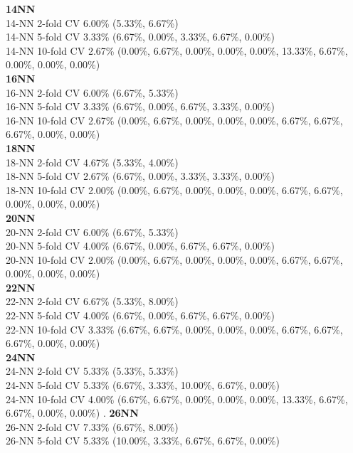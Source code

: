 \documentclass[11pt,a4paper]{article}
\begin{document}
\textbf{14NN }\\
14-NN 2-fold CV  6.00\%  (5.33\%, 6.67\%)\\  
14-NN 5-fold CV  3.33\%  (6.67\%, 0.00\%, 3.33\%, 6.67\%, 0.00\%)\\  
14-NN 10-fold CV  2.67\%  (0.00\%, 6.67\%, 0.00\%, 0.00\%, 0.00\%, 13.33\%, 6.67\%, 0.00\%, 0.00\%, 0.00\%)\\  
\textbf{16NN }\\
16-NN 2-fold CV  6.00\%  (6.67\%, 5.33\%)\\  
16-NN 5-fold CV  3.33\%  (6.67\%, 0.00\%, 6.67\%, 3.33\%, 0.00\%)\\  
16-NN 10-fold CV  2.67\%  (0.00\%, 6.67\%, 0.00\%, 0.00\%, 0.00\%, 6.67\%, 6.67\%, 6.67\%, 0.00\%, 0.00\%)\\  
\textbf{18NN }\\
18-NN 2-fold CV  4.67\%  (5.33\%, 4.00\%)\\  
18-NN 5-fold CV  2.67\%  (6.67\%, 0.00\%, 3.33\%, 3.33\%, 0.00\%)\\  
18-NN 10-fold CV  2.00\%  (0.00\%, 6.67\%, 0.00\%, 0.00\%, 0.00\%, 6.67\%, 6.67\%, 0.00\%, 0.00\%, 0.00\%)\\  
\textbf{20NN }\\
20-NN 2-fold CV  6.00\%  (6.67\%, 5.33\%)\\  
20-NN 5-fold CV  4.00\%  (6.67\%, 0.00\%, 6.67\%, 6.67\%, 0.00\%)\\  
20-NN 10-fold CV  2.00\%  (0.00\%, 6.67\%, 0.00\%, 0.00\%, 0.00\%, 6.67\%, 6.67\%, 0.00\%, 0.00\%, 0.00\%)\\  
\textbf{22NN }\\
22-NN 2-fold CV  6.67\%  (5.33\%, 8.00\%)\\  
22-NN 5-fold CV  4.00\%  (6.67\%, 0.00\%, 6.67\%, 6.67\%, 0.00\%)\\  
22-NN 10-fold CV  3.33\%  (6.67\%, 6.67\%, 0.00\%, 0.00\%, 0.00\%, 6.67\%, 6.67\%, 6.67\%, 0.00\%, 0.00\%) \\
\textbf{24NN }\\
24-NN 2-fold CV  5.33\%  (5.33\%, 5.33\%)\\  
24-NN 5-fold CV  5.33\%  (6.67\%, 3.33\%, 10.00\%, 6.67\%, 0.00\%)\\  
24-NN 10-fold CV  4.00\%  (6.67\%, 6.67\%, 0.00\%, 0.00\%, 0.00\%, 13.33\%, 6.67\%, 6.67\%, 0.00\%, 0.00\%) 
\newpage .\hspace*{-0.85cm}
\textbf{26NN }\\
26-NN 2-fold CV  7.33\%  (6.67\%, 8.00\%)\\  
26-NN 5-fold CV  5.33\%  (10.00\%, 3.33\%, 6.67\%, 6.67\%, 0.00\%)\\  
\end{document}
